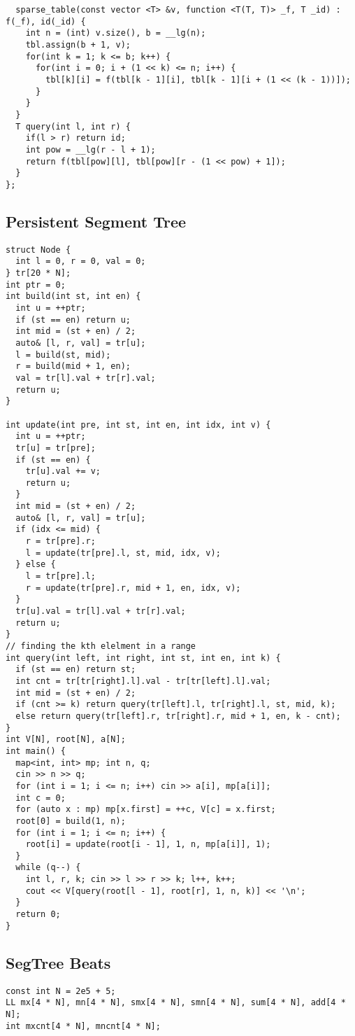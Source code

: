 \documentclass[FSZ,a4paper,onesided]{article}
\begin{document}
\begin{multicols*}{\COLS}
\begin{lstlisting}
  sparse_table(const vector <T> &v, function <T(T, T)> _f, T _id) : f(_f), id(_id) {
    int n = (int) v.size(), b = __lg(n);
    tbl.assign(b + 1, v);
    for(int k = 1; k <= b; k++) {
      for(int i = 0; i + (1 << k) <= n; i++) {
        tbl[k][i] = f(tbl[k - 1][i], tbl[k - 1][i + (1 << (k - 1))]);
      }
    }
  }
  T query(int l, int r) {
    if(l > r) return id;
    int pow = __lg(r - l + 1);
    return f(tbl[pow][l], tbl[pow][r - (1 << pow) + 1]);
  }
};
\end{lstlisting}
\subsection{Persistent Segment Tree}
\begin{lstlisting}
struct Node {
  int l = 0, r = 0, val = 0;
} tr[20 * N];
int ptr = 0;
int build(int st, int en) {
  int u = ++ptr;
  if (st == en) return u;
  int mid = (st + en) / 2;
  auto& [l, r, val] = tr[u];
  l = build(st, mid);
  r = build(mid + 1, en);
  val = tr[l].val + tr[r].val;
  return u;
}

int update(int pre, int st, int en, int idx, int v) {
  int u = ++ptr;
  tr[u] = tr[pre];
  if (st == en) {
    tr[u].val += v;
    return u;
  }
  int mid = (st + en) / 2;
  auto& [l, r, val] = tr[u];
  if (idx <= mid) {
    r = tr[pre].r;
    l = update(tr[pre].l, st, mid, idx, v);
  } else {
    l = tr[pre].l;
    r = update(tr[pre].r, mid + 1, en, idx, v);
  }
  tr[u].val = tr[l].val + tr[r].val;
  return u;
}
// finding the kth elelment in a range
int query(int left, int right, int st, int en, int k) {
  if (st == en) return st;
  int cnt = tr[tr[right].l].val - tr[tr[left].l].val;
  int mid = (st + en) / 2;
  if (cnt >= k) return query(tr[left].l, tr[right].l, st, mid, k);
  else return query(tr[left].r, tr[right].r, mid + 1, en, k - cnt);
}
int V[N], root[N], a[N];
int main() {
  map<int, int> mp; int n, q;
  cin >> n >> q;
  for (int i = 1; i <= n; i++) cin >> a[i], mp[a[i]];
  int c = 0;
  for (auto x : mp) mp[x.first] = ++c, V[c] = x.first;
  root[0] = build(1, n);
  for (int i = 1; i <= n; i++) {
    root[i] = update(root[i - 1], 1, n, mp[a[i]], 1);
  }
  while (q--) {
    int l, r, k; cin >> l >> r >> k; l++, k++;
    cout << V[query(root[l - 1], root[r], 1, n, k)] << '\n';
  }
  return 0;
}
\end{lstlisting}
\subsection{SegTree Beats}
\begin{lstlisting}
const int N = 2e5 + 5;
LL mx[4 * N], mn[4 * N], smx[4 * N], smn[4 * N], sum[4 * N], add[4 * N];
int mxcnt[4 * N], mncnt[4 * N];


\end{lstlisting}
\end{multicols*}
\end{document}
